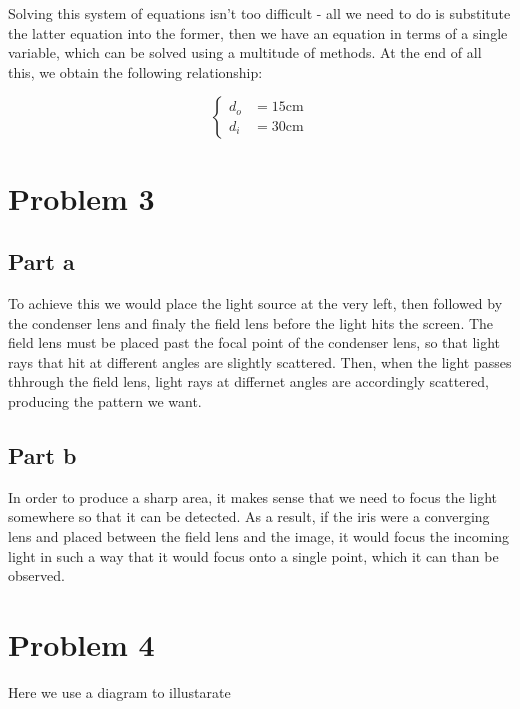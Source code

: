 \documentclass{article}
\theoremstyle{definition}
\numberwithin{equation}{section}
\numberwithin{definition}{section}
\begin{document}
Solving this system of equations isn't too difficult - all we need to do is substitute the latter equation into the former, then we have an equation in terms of a single variable, which can be solved using a multitude of methods. At the end of all this, we obtain the following relationship:

\[ \begin{cases}
    d_o &= 15 \text{cm}\\
    d_i &= 30 \text{cm}
\end{cases}\]



\section{Problem 3}

\subsection*{Part a}

To achieve this we would place the light source at the very left, then followed by the condenser lens and finaly the field lens before the light hits the screen. The field lens must be placed past the focal point of the condenser lens, so that light rays that hit at different angles are slightly scattered. Then, when the light passes thhrough the field lens, light rays at differnet angles are accordingly scattered, producing the pattern we want.


\subsection{Part b}

In order to produce a sharp area, it makes sense that we need to focus the light somewhere so that it can be detected. As a result, if the iris were a converging lens and placed between the field lens and the image, it would focus the incoming light in such a way that it would focus onto a single point, which it can than be observed.

\section{Problem 4}


Here we use a diagram to illustarate 
\end{document}

